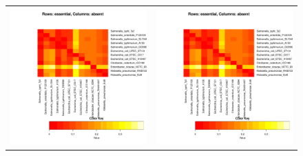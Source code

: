 \documentclass[a4paper,10pt, twocolumn]{article}
\begin{document}
\begin{figure}
\centering
\begin{tabular}{c c}
\includegraphics[page=1, scale=0.35]{essentiality-heatmap.pdf} & 
\includegraphics[page=2, scale=0.35]{essentiality-heatmap.pdf} \\

\end{tabular}
\end{figure}
\end{document}
